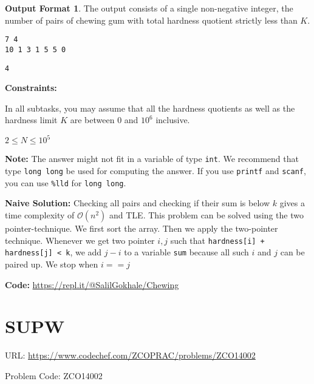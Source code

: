 \documentclass[twoside,12pt,a4paper,english]{book}
\theoremstyle{definition}
\theoremstyle{problemstyle}
\theoremstyle{problemstyle}
\theoremstyle{problemstyle}
\newtheorem*{output_st}{Output Format} %
\begin{document}
\begin{output_st}

The output consists of a single non-negative integer, the number of pairs of chewing gum with total hardness quotient strictly less than $K$.

\end{output_st}

\begin{tcolorbox}[title=Example]
\begin{lstlisting}
7 4
10 1 3 1 5 5 0
\end{lstlisting}
\tcblower
\begin{lstlisting}
4
\end{lstlisting}
\end{tcolorbox}

\textbf{Constraints:}

    In all subtasks, you may assume that all the hardness quotients as well as the hardness limit $K$ are between 0 and $10^6$ inclusive.
    
    $2 \leq N \leq 10^5$

\textbf{Note:} The answer might not fit in a variable of type \texttt{int}. We recommend that type \texttt{long long} be used for computing the answer. If you use \texttt{printf} and \texttt{scanf}, you can use \texttt{\%lld} for \texttt{long long}.

\begin{tcolorbox}[title=Solution]
\textbf{Naive Solution:} Checking all pairs and checking if their sum is below $k$ gives a time complexity of $\mathcal{O}(n^2)$ and TLE.
\tcblower
This problem can be solved using the two pointer-technique. We first sort the array. Then we apply the two-pointer technique. Whenever we get two pointer $i, j$ such that \texttt{hardness[i] + hardness[j] < k}, we add $j-i$ to a variable \texttt{sum} because all such $i$ and $j$ can be paired up. We stop when $i==j$

\textbf{Code: } \url{https://repl.it/@SalilGokhale/Chewing}

\end{tcolorbox}

\newpage

\section{SUPW}

URL: \url{https://www.codechef.com/ZCOPRAC/problems/ZCO14002}

Problem Code: ZCO14002
\end{document}
